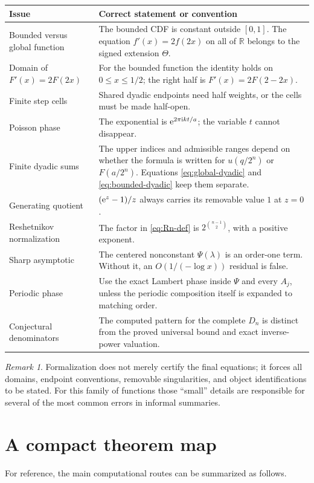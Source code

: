 \documentclass[11pt]{article}
\theoremstyle{definition}
\theoremstyle{remark}
\newtheorem{remark}[theorem]{Remark}
\newcommand{\R}{\mathbb R}\newcommand{\C}{\mathbb C}\newcommand{\Z}{\mathbb Z}
\begin{document}
\begin{longtable}{@{}>{\raggedright\arraybackslash}p{}>{\raggedright\arraybackslash}p{}@{}}
\toprule
Issue & Correct statement or convention\\\midrule\endhead
Bounded versus global function & The bounded CDF is constant outside $[0,1]$.  The equation $f'(x)=2f(2x)$ on all of $\R$ belongs to the signed extension $\Theta$.\\
Domain of $F'(x)=2F(2x)$ & For the bounded function the identity holds on $0\le x\le1/2$; the right half is $F'(x)=2F(2-2x)$.\\
Finite step cells & Shared dyadic endpoints need half weights, or the cells must be made half-open.\\
Poisson phase & The exponential is $\mathrm e^{2\pi\mathrm i kt/a}$; the variable $t$ cannot disappear.\\
Finite dyadic sums & The upper indices and admissible ranges depend on whether the formula is written for $u(q/2^n)$ or $F(a/2^n)$.  Equations \eqref{eq:global-dyadic} and \eqref{eq:bounded-dyadic} keep them separate.\\
Generating quotient & $(\mathrm e^z-1)/z$ always carries its removable value $1$ at $z=0$.\\
Reshetnikov normalization & The factor in \eqref{eq:Rn-def} is $2^{\binom{n-1}{2}}$, with a positive exponent.\\
Sharp asymptotic & The centered nonconstant $\Psi(\lambda)$ is an order-one term.  Without it, an $O(1/(-\log x))$ residual is false.\\
Periodic phase & Use the exact Lambert phase inside $\Psi$ and every $A_j$, unless the periodic composition itself is expanded to matching order.\\
Conjectural denominators & The computed pattern for the complete $D_n$ is distinct from the proved universal bound and exact inverse-power valuation.\\
\bottomrule
\end{longtable}

\begin{remark}
Formalization does not merely certify the final equations; it forces all domains, endpoint conventions, removable singularities, and object identifications to be stated.  For this family of functions those ``small'' details are responsible for several of the most common errors in informal summaries.
\end{remark}

\section{A compact theorem map}\label{sec:map}
For reference, the main computational routes can be summarized as follows.
\end{document}
